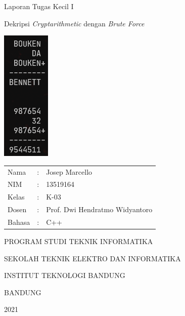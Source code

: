 \documentclass{article}
\begin{document}
\begin{titlepage}
  \centering
  \Large Laporan Tugas Kecil I

  \large Dekripsi \textit{Cryptarithmetic} dengan \textit{Brute Force}

  \normalsize


  \includegraphics{stima-ss-4.png}

  \begin{tabular}{lll}
    Nama  &: & Josep Marcello \\
    NIM &: & 13519164 \\
    Kelas &: & K-03 \\
    Dosen &: & Prof. Dwi Hendratmo Widyantoro \\
    Bahasa &: & C++ \\
  \end{tabular}

  \large
  PROGRAM STUDI TEKNIK INFORMATIKA

  SEKOLAH TEKNIK ELEKTRO DAN INFORMATIKA

  INSTITUT TEKNOLOGI BANDUNG

  BANDUNG

  2021

\end{titlepage}
\end{document}
